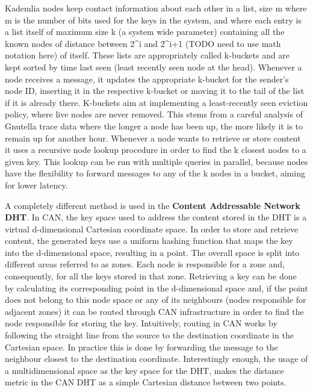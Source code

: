 Kademlia nodes keep contact information about each other in a list, size
m where m is the number of bits used for the keys in the system, and
where each entry is a list itself of maximum size k (a system wide
parameter) containing all the known nodes of distance between 2\^{}i and
2\^{}i+1 (TODO need to use math notation here) of itself. These lists
are appropriately called k-buckets and are kept sorted by time last seen
(least recently seen node at the head). Whenever a node receives a
message, it updates the appropriate k-bucket for the sender's node ID,
inserting it in the respective k-bucket or moving it to the tail of the
list if it is already there. K-buckets aim at implementing a
least-recently seen eviction policy, where live nodes are never removed.
This stems from a careful analysis of Gnutella trace data \cite{Saroiu2002}
where the longer a node has been up, the more likely
it is to remain up for another hour. Whenever a node wants to retrieve
or store content it uses a recursive node lookup procedure in order to
find the k closest nodes to a given key. This lookup can be run with
multiple queries in parallel, because nodes have the flexibility to
forward messages to any of the k nodes in a bucket, aiming for lower
latency.

A completely different method is used in the \textbf{Content Addressable
Network DHT}\cite{Ratnasamy2001a}. In CAN, the key space used to
address the content stored in the DHT is a virtual d-dimensional
Cartesian coordinate space. In order to store and retrieve content, the
generated keys use a uniform hashing function that maps the key into the
d-dimensional space, resulting in a point. The overall space is split
into different areas referred to as zones. Each node is responsible for
a zone and, consequently, for all the keys stored in that zone.
Retrieving a key can be done by calculating its corresponding point in
the d-dimensional space and, if the point does not belong to this node
space or any of its neighbours (nodes responsible for adjacent zones) it
can be routed through CAN infrastructure in order to find the node
responsible for storing the key. Intuitively, routing in CAN works by
following the straight line from the source to the destination
coordinate in the Cartesian space. In practice this is done by
forwarding the message to the neighbour closest to the destination
coordinate. Interestingly enough, the usage of a multidimensional space
as the key space for the DHT, makes the distance metric in the CAN DHT
as a simple Cartesian distance between two points.

